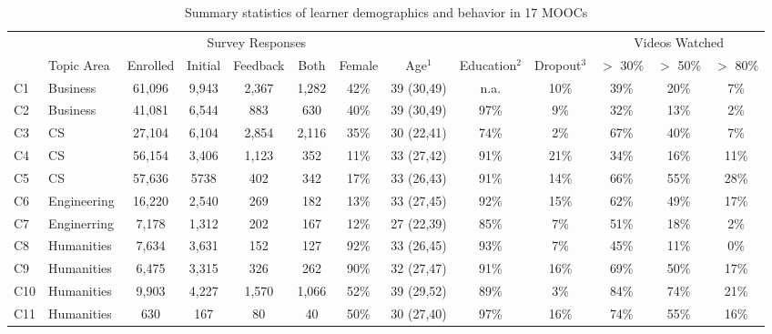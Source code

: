 \documentclass{sigchi}\usepackage[]{graphicx}\usepackage[]{color}
\begin{document}
\begin{table}[th]
\caption{Summary statistics of learner demographics and behavior in 17 MOOCs}
\small
\center
\label{tab:s1sum}
\begin{tabular}{llccccccccccc}
\toprule
 &            &          & \multicolumn{3}{c}{Survey Responses} & & & & & \multicolumn{3}{c}{Videos Watched} \\
 \cmidrule(r){4-6} \cmidrule(r){11-13}
 & Topic Area & Enrolled & Initial & Feedback & Both & Female & Age$^1$   & Education$^2$ & Dropout$^3$ & $>$ 30\% & $>$ 50\% & $>$ 80\% \\
\midrule
C1 & Business & 61,096   & 9,943  & 2,367    & 1,282    & 42\%   & 39 (30,49) & n.a.       & 10\% & 39\% & 20\% & 7\% \\
C2 & Business & 41,081   & 6,544  & 883      & 630      & 40\%   & 39 (30,49) & 97\%       & 9\%  & 32\% & 13\% & 2\% \\
C3 & CS       & 27,104   & 6,104 & 2,854     & 2,116    & 35\%   & 30 (22,41) & 74\%       & 2\%  & 67\% & 40\% & 7\% \\
C4 & CS       & 56,154   & 3,406 & 1,123     & 352      & 11\%   & 33 (27,42) & 91\%       & 21\% & 34\% & 16\% & 11\% \\
C5 & CS       & 57,636   & 5738  & 402       & 342      & 17\%   & 33 (26,43) & 91\%       & 14\% & 66\% & 55\% & 28\% \\
C6 & Engineering & 16,220 & 2,540 & 269      & 182      & 13\%   & 33 (27,45) & 92\%       & 15\% & 62\% & 49\% & 17\% \\
C7 & Enginerring & 7,178 & 1,312 & 202       & 167      & 12\%   & 27 (22,39) & 85\%       & 7\%  & 51\% & 18\% & 2\% \\
C8 & Humanities & 7,634 & 3,631  & 152       & 127      & 92\%   & 33 (26,45) & 93\%       & 7\%  & 45\% & 11\% & 0\% \\
C9 & Humanities & 6,475 & 3,315  & 326       & 262      & 90\%   & 32 (27,47) & 91\%       & 16\% & 69\% & 50\% & 17\% \\
C10 & Humanities & 9,903 & 4,227 & 1,570     & 1,066    & 52\%   & 39 (29,52) & 89\%       & 3\%  & 84\% & 74\% & 21\% \\
C11 & Humanities & 630 & 167     & 80        & 40       & 50\%   & 30 (27,40) & 97\%       & 16\% & 74\% & 55\% & 16\% \\

\end{tabular}
\end{table}
\end{document}

